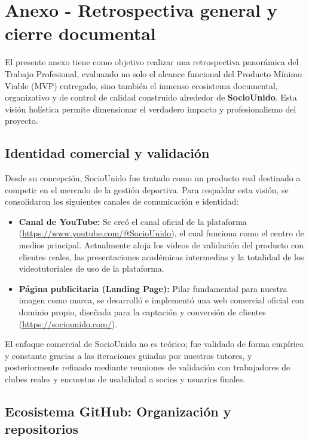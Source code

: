 \section{Anexo - Retrospectiva general y cierre documental}

El presente anexo tiene como objetivo realizar una retrospectiva panorámica del Trabajo Profesional, evaluando no solo el alcance funcional del Producto Mínimo Viable (MVP) entregado, sino también el inmenso ecosistema documental, organizativo y de control de calidad construido alrededor de \textbf{SocioUnido}. Esta visión holística permite dimensionar el verdadero impacto y profesionalismo del proyecto.

\subsection{Identidad comercial y validación}

Desde su concepción, SocioUnido fue tratado como un producto real destinado a competir en el mercado de la gestión deportiva. Para respaldar esta visión, se consolidaron los siguientes canales de comunicación e identidad:

\begin{itemize}
    \item \textbf{Canal de YouTube:} Se creó el canal oficial de la plataforma (\url{https://www.youtube.com/@SocioUnido}), el cual funciona como el centro de medios principal. Actualmente aloja los videos de validación del producto con clientes reales, las presentaciones académicas intermedias y la totalidad de los videotutoriales de uso de la plataforma.
    \item \textbf{Página publicitaria (Landing Page):} Pilar fundamental para nuestra imagen como marca, se desarrolló e implementó una web comercial oficial con dominio propio, diseñada para la captación y conversión de clientes (\url{https://sociounido.com/}).
\end{itemize}

El enfoque comercial de SocioUnido no es teórico; fue validado de forma empírica y constante gracias a las iteraciones guiadas por nuestros tutores, y posteriormente refinado mediante reuniones de validación con trabajadores de clubes reales y encuestas de usabilidad a socios y usuarios finales.

\subsection{Ecosistema GitHub: Organización y repositorios}

